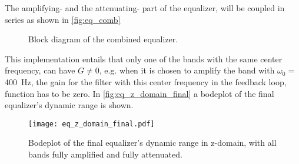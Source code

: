 The amplifying- and the attenuating- part of the equalizer, will be coupled in series as shown in \autoref{fig:eq_comb}

\begin{figure}[!h]
\centering
\def\svgwidth{0.72\columnwidth}
\scalebox{1}{}
\caption{Block diagram of the combined equalizer.}
		\label{fig:eq_comb}
\end{figure}

This implementation entails that only one of the bands with the same center frequency, can have $G \ne 0$, e.g. when it is chosen to amplify the band with $\omega_0 =$ \SI{400}{\hertz}, the gain for the filter with this center frequency in the feedback loop,  function has to be zero. 
In \autoref{fig:eq_z_domain_final} a bodeplot of the final equalizer's dynamic range is shown.

\begin{figure}[!h]
    \centering
        \texttt{[image: eq\_z\_domain\_final.pdf]}
        \caption{Bodeplot of the final equalizer's dynamic range in z-domain, with all bands fully amplified and fully attenuated.}
        \label{fig:eq_z_domain_final}
  \end{figure}


